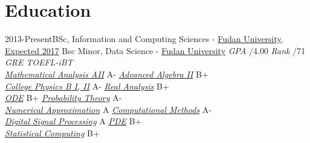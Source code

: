\documentclass[10pt]{article} %
\begin{document}

\section{Education}

\tabblock
{2013-}{Present}{BSc, Information and Computing Sciences - \href{http://math.fudan.edu.cn}{Fudan University, Expected 2017}}
{Bsc Minor, Data Science - \href{http://www.sds.fudan.edu.cn/}{Fudan University}}
{\textit{GPA} /4.00 \> \textit{Rank} /71\\
\textit{GRE}  \> \textit{TOEFL-iBT}  \\
\textit{\href{http://math.fudan.edu.cn/ShowPeople.aspx?info_lb=548&flag=526&info_id=3152}{Mathematical Analysis AII}} \> A- \>
\textit{\href{http://homepage.fudan.edu.cn/qhxie/}{Advanced Algebra II}} \> B+ \\
\textit{\href{http://homepage.fudan.edu.cn/yaoyaojr/}{College Physics B I, II}} \> A- \> \textit{\href{http://math.fudan.edu.cn/ShowPeople.aspx?info_lb=548&flag=526&info_id=2137}{Real Analysis}} \> B+ \\
\textit{\href{http://homepage.fudan.edu.cn/weilin/}{ODE}} \> B+ \> \textit{\href{http://math.fudan.edu.cn/ShowPeople.aspx?info_lb=548&flag=526&info_id=2209}{Probability Theory}} \> A- \\
\textit{\href{http://homepage.fudan.edu.cn/yangfeng/}{Numerical Approximation}} \> A \> \textit{\href{http://homepage.fudan.edu.cn/wggao/}{Computational Methods}} \> A- \\
\textit{\href{http://math.fudan.edu.cn/ShowPeople.aspx?info_lb=548&flag=526&info_id=3140}{Digital Signal Processing}} \> A \> \textit{\href{http://homepage.fudan.edu.cn/zqwang/}{PDE}} \> B+ \\
\textit{\href{http://math.fudan.edu.cn/ShowPeople.aspx?info_lb=548&flag=526&info_id=3144}{Statistical Computing}} \> B+ \\
}

\end{document}
